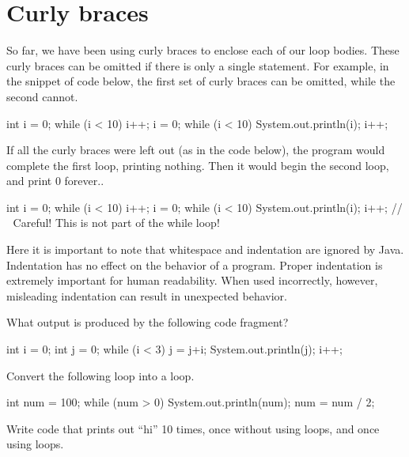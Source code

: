 \section{Curly braces}
So far, we have been using curly braces to enclose each of our loop bodies. These curly braces can be omitted if there is only a single statement. For example, in the snippet of code below, the first set of curly braces can be omitted, while the second cannot.

\begin{code}
int i = 0;
while (i < 10)
{
    i++;
}
i = 0;
while (i < 10)
{
    System.out.println(i);
    i++;
}
\end{code}

\noindent If all the curly braces were left out (as in the code below), the program would complete the first loop, printing nothing. Then it would begin the second loop, and print 0 forever..

\begin{code}
int i = 0;
while (i < 10)
    i++;
i = 0;
while (i < 10)
    System.out.println(i);
    i++;
// ^^^ Careful! This is not part of the while loop!
\end{code}

Here it is important to note that whitespace and indentation are ignored by Java. Indentation has no effect on the behavior of a program. Proper indentation is extremely important for human readability. When used incorrectly, however, misleading indentation can result in unexpected behavior.

\exercisesection

\begin{exercise}
What output is produced by the following code fragment?

\begin{code}
int i = 0;
int j = 0;
while (i < 3)
{
  j = j+i;
  System.out.println(j);
  i++;
}
\end{code}
\end{exercise}

\begin{exercise}
Convert the following loop into a  loop.

\begin{code}
int num = 100;
while (num > 0)
{
    System.out.println(num);
    num = num / 2;
}
\end{code}
\end{exercise}

\begin{exercise}
  Write code that prints out ``hi'' 10 times, once without using loops, and once
  using loops.
\end{exercise}


